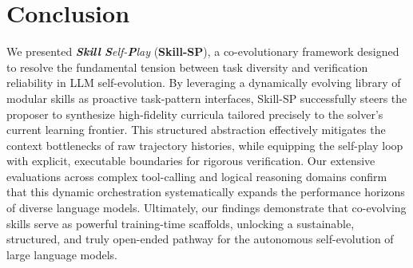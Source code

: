 \section{Conclusion}
\label{sec:conclusion}

We presented \emph{\textbf{Skill} \textbf{S}elf-\textbf{P}lay} (\textbf{Skill-SP}), a co-evolutionary framework designed to resolve the fundamental tension between task diversity and verification reliability in LLM self-evolution. 
By leveraging a dynamically evolving library of modular skills as proactive task-pattern interfaces, Skill-SP successfully steers the proposer to synthesize high-fidelity curricula tailored precisely to the solver's current learning frontier. 
This structured abstraction effectively mitigates the context bottlenecks of raw trajectory histories, while equipping the self-play loop with explicit, executable boundaries for rigorous verification. 
Our extensive evaluations across complex tool-calling and logical reasoning domains confirm that this dynamic orchestration systematically expands the performance horizons of diverse language models. Ultimately, our findings demonstrate that co-evolving skills serve as powerful training-time scaffolds, unlocking a sustainable, structured, and truly open-ended pathway for the autonomous self-evolution of large language models.